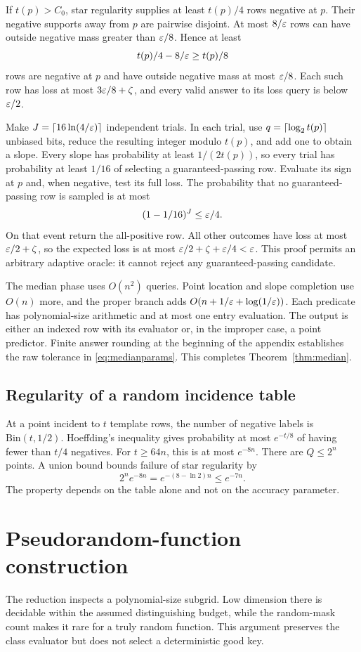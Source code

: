 If $t(p)>C_0$, star regularity supplies at least $t(p)/4$ rows negative at $p$. Their negative supports away from $p$ are pairwise disjoint. At most $8/\varepsilon$ rows can have outside negative mass greater than $\varepsilon/8$. Hence at least
\[
 t(p)/4-8/\varepsilon\ge t(p)/8
\]
rows are negative at $p$ and have outside negative mass at most $\varepsilon/8$. Each such row has loss at most $3\varepsilon/8+\zeta$, and every valid answer to its loss query is below $\varepsilon/2$.

Make $J=\lceil 16\ln(4/\varepsilon)\rceil$ independent trials. In each trial, use $q=\lceil \log_2t(p)\rceil$ unbiased bits, reduce the resulting integer modulo $t(p)$, and add one to obtain a slope. Every slope has probability at least $1/(2t(p))$, so every trial has probability at least $1/16$ of selecting a guaranteed-passing row. Evaluate its sign at $p$ and, when negative, test its full loss. The probability that no guaranteed-passing row is sampled is at most
\[
 (1-1/16)^J\le\varepsilon/4.
\]
On that event return the all-positive row. All other outcomes have loss at most $\varepsilon/2+\zeta$, so the expected loss is at most $\varepsilon/2+\zeta+\varepsilon/4<\varepsilon$. This proof permits an arbitrary adaptive oracle: it cannot reject any guaranteed-passing candidate.

The median phase uses $O(n^2)$ queries. Point location and slope completion use $O(n)$ more, and the proper branch adds $O(n+1/\varepsilon+\log(1/\varepsilon))$. Each predicate has polynomial-size arithmetic and at most one entry evaluation. The output is either an indexed row with its evaluator or, in the improper case, a point predictor. Finite answer rounding at the beginning of the appendix establishes the raw tolerance in \eqref{eq:medianparams}. This completes Theorem~\ref{thm:median}.

\subsection{Regularity of a random incidence table}
At a point incident to $t$ template rows, the number of negative labels is $\mathrm{Bin}(t,1/2)$. Hoeffding's inequality gives probability at most $e^{-t/8}$ of having fewer than $t/4$ negatives. For $t\ge64n$, this is at most $e^{-8n}$. There are $Q\le2^n$ points. A union bound bounds failure of star regularity by
\[
 2^n e^{-8n}=e^{-(8-\ln2)n}\le e^{-7n}.
\]
The property depends on the table alone and not on the accuracy parameter.

\section{Pseudorandom-function construction}
\label{app:prf}
The reduction inspects a polynomial-size subgrid. Low dimension there is decidable within the assumed distinguishing budget, while the random-mask count makes it rare for a truly random function. This argument preserves the class evaluator but does not select a deterministic good key.

